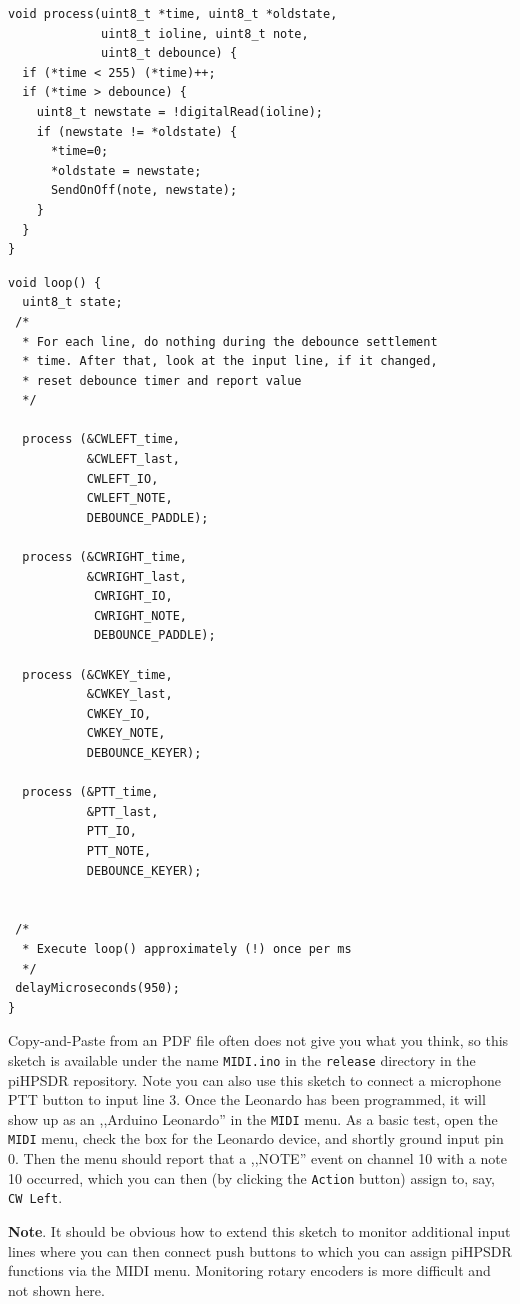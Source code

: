 \documentclass[12pt]{book}
\def\rett#1{\texttt{\color{red}#1}}
\def\bltt#1{\texttt{\color{blue}#1}}
\def\pH{pi\-HPSDR\xspace}
\begin{document}
\begin{small}
\begin{verbatim}
void process(uint8_t *time, uint8_t *oldstate,
             uint8_t ioline, uint8_t note,
             uint8_t debounce) {
  if (*time < 255) (*time)++;
  if (*time > debounce) {
    uint8_t newstate = !digitalRead(ioline);
    if (newstate != *oldstate) {
      *time=0;
      *oldstate = newstate;
      SendOnOff(note, newstate);
    }
  }
}
\end{verbatim}
\clearpage
\begin{verbatim}
void loop() {
  uint8_t state;
 /*
  * For each line, do nothing during the debounce settlement
  * time. After that, look at the input line, if it changed,
  * reset debounce timer and report value
  */

  process (&CWLEFT_time,
           &CWLEFT_last,
           CWLEFT_IO,
           CWLEFT_NOTE,
           DEBOUNCE_PADDLE);

  process (&CWRIGHT_time,
           &CWRIGHT_last,
            CWRIGHT_IO,
            CWRIGHT_NOTE,
            DEBOUNCE_PADDLE);

  process (&CWKEY_time,
           &CWKEY_last,
           CWKEY_IO,
           CWKEY_NOTE,
           DEBOUNCE_KEYER);

  process (&PTT_time,
           &PTT_last,
           PTT_IO,
           PTT_NOTE,
           DEBOUNCE_KEYER);


 /*
  * Execute loop() approximately (!) once per ms
  */
 delayMicroseconds(950);
}
\end{verbatim}
\end{small}
\clearpage
Copy-and-Paste from an PDF file often does not give you what you think, so
this sketch is available under the name \texttt{MIDI.ino} in the \texttt{release}
directory in the \pH repository. Note you can
also use this sketch to connect a microphone PTT button to input line 3. Once the
Leonardo has been programmed,
it will show up as an ,,Arduino Leonardo'' in the \bltt{MIDI} menu. As a basic test,
open the \bltt{MIDI} menu, check the box for the Leonardo device,
 and shortly ground input pin 0. Then the menu should report
that a ,,NOTE'' event on channel 10 with a note 10 occurred, which you can then
(by clicking the \rett{Action} button) assign to, say, \bltt{CW Left}.

\textbf{Note}. It should be obvious how to extend this sketch to monitor additional
input lines where you can then connect push buttons to which you can assign \pH
functions via the MIDI menu. Monitoring rotary encoders is more difficult and not
shown here.
\end{document}

